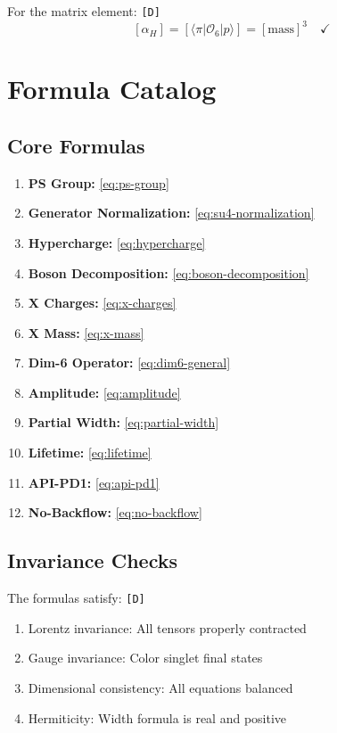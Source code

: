 \documentclass[11pt,a4paper]{article}
\newcommand{\tagD}{\textcolor{green!50!black}{\texttt{[D]}}}
\theoremstyle{definition}
\begin{document}
For the matrix element: \tagD{}
\begin{equation}
\label{eq:dim-check-alpha}
[\alpha_H] = [\langle \pi | \mathcal{O}_6 | p \rangle] = [\text{mass}]^3 \quad \checkmark
\end{equation}

\section{Formula Catalog}
\label{app:formulas}

\subsection{Core Formulas}
\label{app:core-formulas}

\begin{enumerate}
  \item \textbf{PS Group:} \eqref{eq:ps-group}
  \item \textbf{Generator Normalization:} \eqref{eq:su4-normalization}
  \item \textbf{Hypercharge:} \eqref{eq:hypercharge}
  \item \textbf{Boson Decomposition:} \eqref{eq:boson-decomposition}
  \item \textbf{X Charges:} \eqref{eq:x-charges}
  \item \textbf{X Mass:} \eqref{eq:x-mass}
  \item \textbf{Dim-6 Operator:} \eqref{eq:dim6-general}
  \item \textbf{Amplitude:} \eqref{eq:amplitude}
  \item \textbf{Partial Width:} \eqref{eq:partial-width}
  \item \textbf{Lifetime:} \eqref{eq:lifetime}
  \item \textbf{API-PD1:} \eqref{eq:api-pd1}
  \item \textbf{No-Backflow:} \eqref{eq:no-backflow}
\end{enumerate}

\subsection{Invariance Checks}
\label{app:invariances}

The formulas satisfy: \tagD{}
\begin{enumerate}
  \item Lorentz invariance: All tensors properly contracted
  \item Gauge invariance: Color singlet final states
  \item Dimensional consistency: All equations balanced
  \item Hermiticity: Width formula is real and positive
\end{enumerate}
\end{document}
